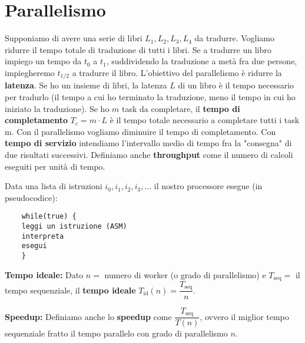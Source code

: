 

\section{Parallelismo}

\begin{defn}

	Supponiamo di avere una serie di libri $ L_1, L_2, L_3, L_4 $ da tradurre.
	Vogliamo ridurre il tempo totale di traduzione di tutti i libri. Se a
	tradurre un libro impiego un tempo da $ t_0 $ a $ t_1 $, suddividendo la
	traduzione a metà fra due persone, impiegheremo $ t_{1/2} $ a tradurre il
	libro. L'obiettivo del parallelismo è ridurre la \textbf{latenza}. Se ho un
	insieme di libri, la latenza $ L $ di un libro è il tempo necessario per
	tradurlo (il tempo a cui ho terminato la traduzione, meno il tempo in cui ho
	iniziato la traduzione). Se ho $ m $ task da completare, il \textbf{tempo di
	completamento}  $ T_c = m \cdot L$ è il tempo totale necessario a completare
	tutti i task m. Con il parallelismo vogliamo diminuire il tempo di
	completamento. Con \textbf{tempo di servizio} intendiamo l'intervallo medio
	di tempo fra la "consegna" di due risultati successivi. Definiamo anche
	\textbf{throughput} come il numero di calcoli eseguiti per unità di tempo.
	
	Data una lista di istruzioni $ i_0, i_1, i_2, i_3, \dots $ il nostro
	processore esegue (in pseudocodice):

	\begin{lstlisting}
	while(true) {
	leggi un istruzione (ASM)
	interpreta
	esegui
	}
	\end{lstlisting} 
\end{defn}


\begin{defn}
	\textbf{Tempo ideale:}
	Dato $ n = $ numero di worker (o grado di parallelismo) e $ T_{\text{seq}} =
	$ il tempo sequenziale, il \textbf{tempo ideale} $ T_{\text{id}}(n) =
	\dfrac{T_{\text{seq}}}{n}$.
\end{defn}


\begin{defn}
	\textbf{Speedup:}
	Definiamo anche lo \textbf{speedup} come $ \dfrac{T_{\text{seq}}}{T(n)} $,
	ovvero il miglior tempo sequenziale fratto il tempo parallelo con grado di
	parallelismo $ n $.
\end{defn}

